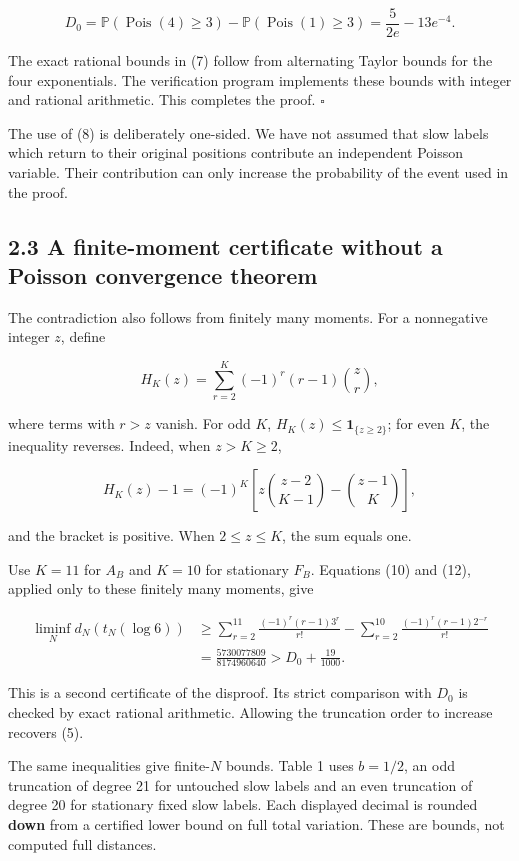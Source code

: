 \documentclass[
  british,
  11pt,
]{article}
\begin{document}
\[
D_0=\mathbb P(\operatorname{Pois}(4)\ge3)
-\mathbb P(\operatorname{Pois}(1)\ge3)
=\frac{5}{2e}-13e^{-4}.
\]

The exact rational bounds in (7) follow from alternating Taylor bounds
for the four exponentials. The verification program implements these
bounds with integer and rational arithmetic. This completes the proof.
\(\square\)

The use of (8) is deliberately one-sided. We have not assumed that slow
labels which return to their original positions contribute an
independent Poisson variable. Their contribution can only increase the
probability of the event used in the proof.

\subsection{2.3 A finite-moment certificate without a Poisson
convergence
theorem}\label{a-finite-moment-certificate-without-a-poisson-convergence-theorem}

The contradiction also follows from finitely many moments. For a
nonnegative integer \(z\), define

\[H_K(z)=\sum_{r=2}^{K}(-1)^r(r-1)\binom zr,\]

where terms with \(r>z\) vanish. For odd \(K\),
\(H_K(z)\le\mathbf1_{\{z\ge2\}}\); for even \(K\), the inequality
reverses. Indeed, when \(z>K\ge2\),

\[
H_K(z)-1=(-1)^K
\left[z\binom{z-2}{K-1}-\binom{z-1}{K}\right],
\]

and the bracket is positive. When \(2\le z\le K\), the sum equals one.

Use \(K=11\) for \(A_B\) and \(K=10\) for stationary \(F_B\). Equations
(10) and (12), applied only to these finitely many moments, give

\[
\begin{aligned}
\liminf_Nd_N(t_N(\log6))
&\ge\sum_{r=2}^{11}\frac{(-1)^r(r-1)3^r}{r!}
-\sum_{r=2}^{10}\frac{(-1)^r(r-1)2^{-r}}{r!}\\
&=\frac{5730077809}{8174960640}
> D_0+\frac{19}{1000}.
\end{aligned} \tag{13}
\]

This is a second certificate of the disproof. Its strict comparison with
\(D_0\) is checked by exact rational arithmetic. Allowing the truncation
order to increase recovers (5).

The same inequalities give finite-\(N\) bounds. Table 1 uses \(b=1/2\),
an odd truncation of degree 21 for untouched slow labels and an even
truncation of degree 20 for stationary fixed slow labels. Each displayed
decimal is rounded \textbf{down} from a certified lower bound on full
total variation. These are bounds, not computed full distances.
\end{document}
